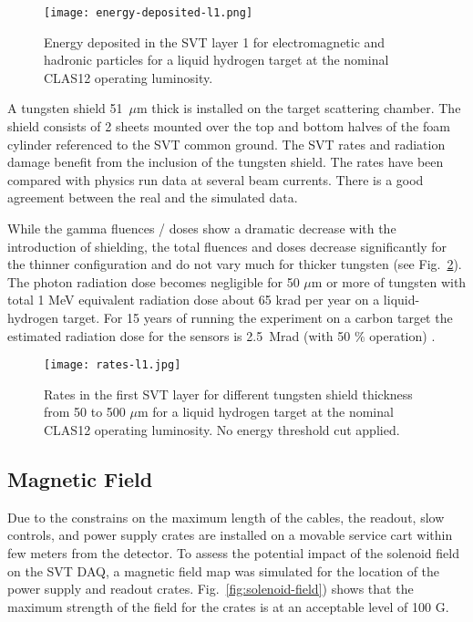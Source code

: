 \begin{figure}[hbt] 
\centering 
\texttt{[image: energy-deposited-l1.png]}
\caption{Energy deposited in the SVT layer 1 for electromagnetic and hadronic particles for a liquid hydrogen target at the nominal CLAS12 operating luminosity.}
\label{fig:energy-deposited-l1}
\end{figure}

A tungsten shield 51~$\mu$m thick is installed on the target scattering chamber. The shield consists of 2 sheets mounted over the top and bottom halves of the foam cylinder referenced to the SVT common ground. The SVT rates and radiation damage benefit from the inclusion of the tungsten shield. The rates have been compared with physics run data at several beam currents. There is a good agreement between the real and the simulated data.

While the gamma fluences / doses show a dramatic decrease with the introduction of shielding, the total fluences and doses decrease significantly for the thinner configuration and do not vary much for thicker tungsten (see Fig.~\ref{fig:rates-l1}). The photon radiation dose becomes negligible for 50 $\mu$m or more of tungsten with total 1 MeV equivalent radiation dose about 65 krad per year on a liquid-hydrogen target. For 15 years of running the experiment on a carbon target the estimated radiation dose for the sensors is 2.5~Mrad (with 50 $\%$ operation) \cite{TDRSVT}. 

\begin{figure}[hbt] 
\centering 
\texttt{[image: rates-l1.jpg]}
\caption{Rates in the first SVT layer for different tungsten shield thickness from 50 to 500 $\mu$m for a liquid hydrogen target at the nominal CLAS12 operating luminosity. No energy threshold cut applied.}
\label{fig:rates-l1}
\end{figure}

\subsection{Magnetic Field}

Due to the constrains on the maximum length of the cables, the readout, slow controls, and power supply crates are installed on a movable service cart within few meters from the detector. To assess the potential impact of the solenoid field on the SVT DAQ, a magnetic field map was simulated for the location of the power supply and readout crates. Fig.~\ref{fig:solenoid-field}) shows that the maximum strength of the field for the crates is at an acceptable level of 100 G.

